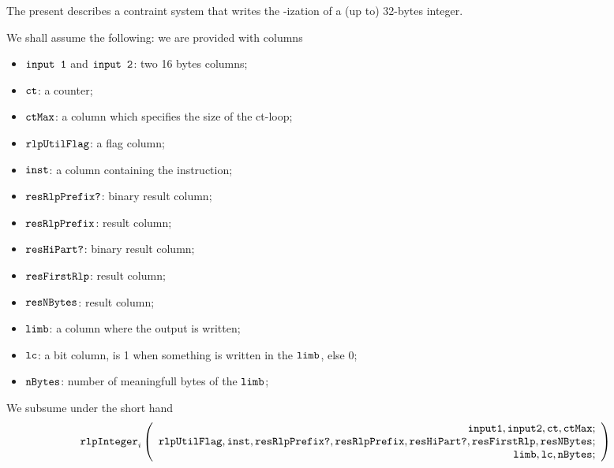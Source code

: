 The present describes a contraint system that writes the \rlp{}-ization of a (up to) 32-bytes integer.

We shall assume the following: we are provided with columns
\begin{itemize}
    \item $\texttt{input 1}$ and $\texttt{input 2}$: two 16 bytes columns;
    \item $\texttt{ct}$: a counter;
    \item $\texttt{ctMax}$: a column which specifies the size of the ct-loop;
    \item $\texttt{rlpUtilFlag}$: a flag column;
    \item $\texttt{inst}$: a column containing the instruction;
    \item $\texttt{resRlpPrefix?}$: binary result column;
    \item $\texttt{resRlpPrefix}$: result column;
    \item $\texttt{resHiPart?}$: binary result column;
    \item $\texttt{resFirstRlp}$: result column;
    \item $\texttt{resNBytes}$: result column;
    \item $\texttt{limb}$: a column where the output is written;
    \item $\texttt{lc}$: a bit column, is 1 when something is written in the $\texttt{limb}$, else 0;
    \item $\texttt{nBytes}$: number of meaningfull bytes of the $\texttt{limb}$;
\end{itemize}

\noindent We subsume under the short hand
\[
    \texttt{rlpInteger}_{i}
    \left(
    \begin{array}{r}
	\texttt{input1},
	\texttt{input2},
	\texttt{ct},
	\texttt{ctMax}; \\
	\texttt{rlpUtilFlag},
	\texttt{inst},
	\texttt{resRlpPrefix?},
	\texttt{resRlpPrefix},
	\texttt{resHiPart?},
	\texttt{resFirstRlp},
	\texttt{resNBytes}; \\
	\texttt{limb},
	\texttt{lc},
	\texttt{nBytes}; \\
    \end{array}
    \right)
\]

